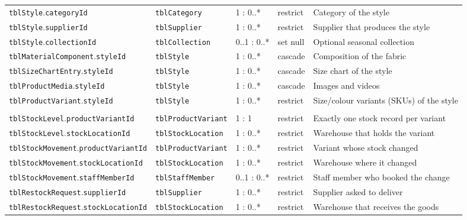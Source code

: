 {\begin{xltabular}{\textwidth}{@{}L{4.0cm} L{3.2cm} L{1.3cm} L{1.2cm} Y@{}}
\texttt{tblStyle}.\allowbreak\texttt{categoryId} & \texttt{tblCategory} & 1 : 0..* & restrict & Category of the style \\
\texttt{tblStyle}.\allowbreak\texttt{supplierId} & \texttt{tblSupplier} & 1 : 0..* & restrict & Supplier that produces the style \\
\texttt{tblStyle}.\allowbreak\texttt{collectionId} & \texttt{tblCollection} & 0..1 : 0..* & set null & Optional seasonal collection \\
\texttt{tblMaterialComponent}.\allowbreak\texttt{styleId} & \texttt{tblStyle} & 1 : 0..* & cascade & Composition of the fabric \\
\texttt{tblSizeChartEntry}.\allowbreak\texttt{styleId} & \texttt{tblStyle} & 1 : 0..* & cascade & Size chart of the style \\
\texttt{tblProductMedia}.\allowbreak\texttt{styleId} & \texttt{tblStyle} & 1 : 0..* & cascade & Images and videos \\
\texttt{tblProductVariant}.\allowbreak\texttt{styleId} & \texttt{tblStyle} & 1 : 0..* & restrict & Size/colour variants (SKUs) of the style \\ \addlinespace
{} \\
\texttt{tblStockLevel}.\allowbreak\texttt{productVariantId} & \texttt{tblProductVariant} & 1 : 1 & restrict & Exactly one stock record per variant \\
\texttt{tblStockLevel}.\allowbreak\texttt{stockLocationId} & \texttt{tblStockLocation} & 1 : 0..* & restrict & Warehouse that holds the variant \\
\texttt{tblStockMovement}.\allowbreak\texttt{productVariantId} & \texttt{tblProductVariant} & 1 : 0..* & restrict & Variant whose stock changed \\
\texttt{tblStockMovement}.\allowbreak\texttt{stockLocationId} & \texttt{tblStockLocation} & 1 : 0..* & restrict & Warehouse where it changed \\
\texttt{tblStockMovement}.\allowbreak\texttt{staffMemberId} & \texttt{tblStaffMember} & 0..1 : 0..* & restrict & Staff member who booked the change \\
\texttt{tblRestockRequest}.\allowbreak\texttt{supplierId} & \texttt{tblSupplier} & 1 : 0..* & restrict & Supplier asked to deliver \\
\texttt{tblRestockRequest}.\allowbreak\texttt{stockLocationId} & \texttt{tblStockLocation} & 1 : 0..* & restrict & Warehouse that receives the goods \\

\end{xltabular}}
